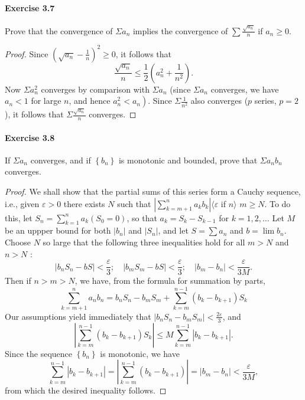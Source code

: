 \documentclass{article}
\theoremstyle{definition}
\begin{document}
\paragraph{Exercise 3.7} Prove that the convergence of $\Sigma a_{n}$ implies the convergence of $\sum \frac{\sqrt{a_{n}}}{n}$ if $a_n\geq 0$.
\begin{proof}
    Since $\left(\sqrt{a_n}-\frac{1}{n}\right)^2 \geq 0$, it follows that
$$
\frac{\sqrt{a_n}}{n} \leq \frac{1}{2}\left(a_n^2+\frac{1}{n^2}\right) .
$$
Now $\Sigma a_n^2$ converges by comparison with $\Sigma a_n$ (since $\Sigma a_n$ converges, we have $a_n<1$ for large $n$, and hence $\left.a_n^2<a_n\right)$. Since $\Sigma \frac{1}{n^2}$ also converges ($p$ series, $p=2$ ), it follows that $\Sigma \frac{\sqrt{a_n}}{n}$ converges.
\end{proof}



\paragraph{Exercise 3.8} If $\Sigma a_{n}$ converges, and if $\left\{b_{n}\right\}$ is monotonic and bounded, prove that $\Sigma a_{n} b_{n}$ converges.
\begin{proof}
    We shall show that the partial sums of this series form a Cauchy sequence, i.e., given $\varepsilon>0$ there exists $N$ such that $\left|\sum_{k=m+1}^n a_k b_k\right|\langle\varepsilon$ if $n\rangle$ $m \geq N$. To do this, let $S_n=\sum_{k=1}^n a_k\left(S_0=0\right)$, so that $a_k=S_k-S_{k-1}$ for $k=1,2, \ldots$ Let $M$ be an uppper bound for both $\left|b_n\right|$ and $\left|S_n\right|$, and let $S=\sum a_n$ and $b=\lim b_n$. Choose $N$ so large that the following three inequalities hold for all $m>N$ and $n>N$ :
$$
\left|b_n S_n-b S\right|<\frac{\varepsilon}{3} ; \quad\left|b_m S_m-b S\right|<\frac{\varepsilon}{3} ; \quad\left|b_m-b_n\right|<\frac{\varepsilon}{3 M} .
$$
Then if $n>m>N$, we have, from the formula for summation by parts,
$$
\sum_{k=m+1}^n a_n b_n=b_n S_n-b_m S_m+\sum_{k=m}^{n-1}\left(b_k-b_{k+1}\right) S_k
$$
Our assumptions yield immediately that $\left|b_n S_n-b_m S_m\right|<\frac{2 \varepsilon}{3}$, and
$$
\left|\sum_{k=m}^{n-1}\left(b_k-b_{k+1}\right) S_k\right| \leq M \sum_{k=m}^{n-1}\left|b_k-b_{k+1}\right| .
$$
Since the sequence $\left\{b_n\right\}$ is monotonic, we have
$$
\sum_{k=m}^{n-1}\left|b_k-b_{k+1}\right|=\left|\sum_{k=m}^{n-1}\left(b_k-b_{k+1}\right)\right|=\left|b_m-b_n\right|<\frac{\varepsilon}{3 M},
$$
from which the desired inequality follows.
\end{proof}
\end{document}
